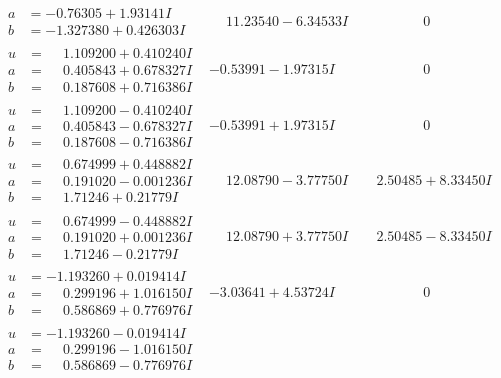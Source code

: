 \documentclass[1p]{elsarticle_modified}
\theoremstyle{definition}
\begin{document}
$$\begin{array}{c|c|c}
\begin{aligned}
a &= -0.76305 + 1.93141 I \\
b &= -1.327380 + 0.426303 I\end{aligned}
 & \phantom{-}11.23540 - 6.34533 I & \phantom{-0.000000 } 0 \\ \hline\begin{aligned}
u &= \phantom{-}1.109200 + 0.410240 I \\
a &= \phantom{-}0.405843 + 0.678327 I \\
b &= \phantom{-}0.187608 + 0.716386 I\end{aligned}
 & -0.53991 - 1.97315 I & \phantom{-0.000000 } 0 \\ \hline\begin{aligned}
u &= \phantom{-}1.109200 - 0.410240 I \\
a &= \phantom{-}0.405843 - 0.678327 I \\
b &= \phantom{-}0.187608 - 0.716386 I\end{aligned}
 & -0.53991 + 1.97315 I & \phantom{-0.000000 } 0 \\ \hline\begin{aligned}
u &= \phantom{-}0.674999 + 0.448882 I \\
a &= \phantom{-}0.191020 - 0.001236 I \\
b &= \phantom{-}1.71246 + 0.21779 I\end{aligned}
 & \phantom{-}12.08790 - 3.77750 I & \phantom{-}2.50485 + 8.33450 I \\ \hline\begin{aligned}
u &= \phantom{-}0.674999 - 0.448882 I \\
a &= \phantom{-}0.191020 + 0.001236 I \\
b &= \phantom{-}1.71246 - 0.21779 I\end{aligned}
 & \phantom{-}12.08790 + 3.77750 I & \phantom{-}2.50485 - 8.33450 I \\ \hline\begin{aligned}
u &= -1.193260 + 0.019414 I \\
a &= \phantom{-}0.299196 + 1.016150 I \\
b &= \phantom{-}0.586869 + 0.776976 I\end{aligned}
 & -3.03641 + 4.53724 I & \phantom{-0.000000 } 0 \\ \hline\begin{aligned}
u &= -1.193260 - 0.019414 I \\
a &= \phantom{-}0.299196 - 1.016150 I \\
b &= \phantom{-}0.586869 - 0.776976 I\end{aligned}

\end{array}$$
\end{document}

